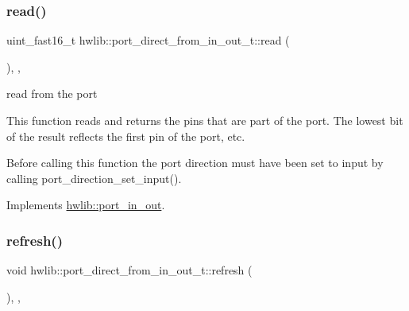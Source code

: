 \mbox{\label{classhwlib_1_1port__direct__from__in__out__t_adfcd5d0e4d4d76a1e92a37fc8e007f0b}} 
\subsubsection{\texorpdfstring{read()}{read()}}
{\footnotesize\ttfamily uint\+\_\+fast16\+\_\+t hwlib\+::port\+\_\+direct\+\_\+from\+\_\+in\+\_\+out\+\_\+t\+::read (\begin{DoxyParamCaption}{ }\end{DoxyParamCaption})\hspace{0.3cm}{\ttfamily [inline]}, {\ttfamily [override]}, {\ttfamily [virtual]}}

read from the port

This function reads and returns the pins that are part of the port. The lowest bit of the result reflects the first pin of the port, etc.

Before calling this function the port direction must have been set to input by calling port\+\_\+direction\+\_\+set\+\_\+input(). 

Implements \hyperlink{classhwlib_1_1port__in__out_a5f6662d6fccd2b256d20722a4f3e5840}{hwlib\+::port\+\_\+in\+\_\+out}.

\mbox{\label{classhwlib_1_1port__direct__from__in__out__t_a4c609a465a6cd1996780001a04ae5bf4}} 
\subsubsection{\texorpdfstring{refresh()}{refresh()}}
{\footnotesize\ttfamily void hwlib\+::port\+\_\+direct\+\_\+from\+\_\+in\+\_\+out\+\_\+t\+::refresh (\begin{DoxyParamCaption}{ }\end{DoxyParamCaption})\hspace{0.3cm}{\ttfamily [inline]}, {\ttfamily [override]}, {\ttfamily [virtual]}}

